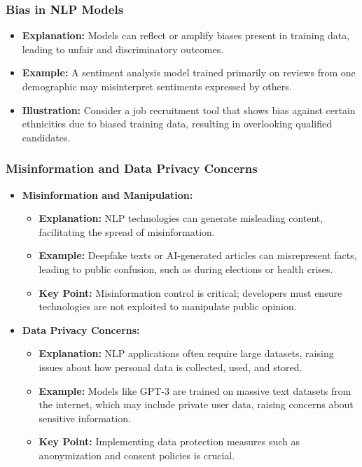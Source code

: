 \documentclass{beamer}
\begin{document}
\begin{frame}[fragile]
    \frametitle{Bias in NLP Models}
    \begin{itemize}
        \item \textbf{Explanation:} Models can reflect or amplify biases present in training data, leading to unfair and discriminatory outcomes.
        \item \textbf{Example:} A sentiment analysis model trained primarily on reviews from one demographic may misinterpret sentiments expressed by others.
        \item \textbf{Illustration:} Consider a job recruitment tool that shows bias against certain ethnicities due to biased training data, resulting in overlooking qualified candidates.
    \end{itemize}
\end{frame}

\begin{frame}[fragile]
    \frametitle{Misinformation and Data Privacy Concerns}
    \begin{itemize}
        \item \textbf{Misinformation and Manipulation:}
        \begin{itemize}
            \item \textbf{Explanation:} NLP technologies can generate misleading content, facilitating the spread of misinformation.
            \item \textbf{Example:} Deepfake texts or AI-generated articles can misrepresent facts, leading to public confusion, such as during elections or health crises.
            \item \textbf{Key Point:} Misinformation control is critical; developers must ensure technologies are not exploited to manipulate public opinion.
        \end{itemize}

        \item \textbf{Data Privacy Concerns:}
        \begin{itemize}
            \item \textbf{Explanation:} NLP applications often require large datasets, raising issues about how personal data is collected, used, and stored.
            \item \textbf{Example:} Models like GPT-3 are trained on massive text datasets from the internet, which may include private user data, raising concerns about sensitive information.
            \item \textbf{Key Point:} Implementing data protection measures such as anonymization and consent policies is crucial.
        \end{itemize}
    \end{itemize}
\end{frame}
\end{document}
